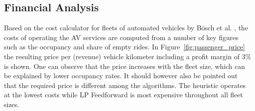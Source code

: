 \subsection{Financial Analysis}
\label{sec:cost_analysis}

Based on the cost calculator for fleets of automated vehicles by Bösch et al. \cite{Bosch2016a},
 the costs of operating the AV services are computed from a number of key figures
 such as the occupancy and share of empty rides. In Figure~\ref{fig:passenger_price}
 the resulting price per (revenue) vehicle kilometer including a profit margin of 3\% is shown. One can observe that the
 price increases with the fleet size, which can be explained by lower occupancy rates.
 It should however also be pointed out that the required price is different among the algorithms.
 The heuristic operates at the lowest costs while LP Feedforward is most expensive throughout all fleet sizes.


\captionsetup[subfigure]{width=0.9\textwidth}

